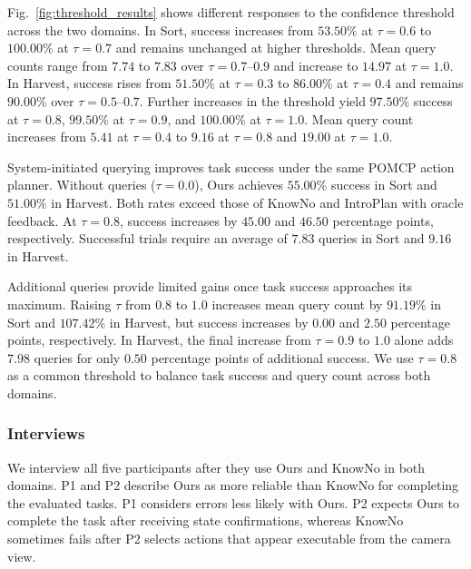 Fig.~\ref{fig:threshold_results} shows different responses to the confidence threshold across the two domains. In Sort, success increases from $53.50\%$ at $\tau=0.6$ to $100.00\%$ at $\tau=0.7$ and remains unchanged at higher thresholds. Mean query counts range from $7.74$ to $7.83$ over $\tau=0.7$--$0.9$ and increase to $14.97$ at $\tau=1.0$. In Harvest, success rises from $51.50\%$ at $\tau=0.3$ to $86.00\%$ at $\tau=0.4$ and remains $90.00\%$ over $\tau=0.5$--$0.7$. Further increases in the threshold yield $97.50\%$ success at $\tau=0.8$, $99.50\%$ at $\tau=0.9$, and $100.00\%$ at $\tau=1.0$. Mean query count increases from $5.41$ at $\tau=0.4$ to $9.16$ at $\tau=0.8$ and $19.00$ at $\tau=1.0$.

System-initiated querying improves task success under the same POMCP action planner. Without queries ($\tau=0.0$), Ours achieves $55.00\%$ success in Sort and $51.00\%$ in Harvest. Both rates exceed those of KnowNo and IntroPlan with oracle feedback. At $\tau=0.8$, success increases by $45.00$ and $46.50$ percentage points, respectively. Successful trials require an average of $7.83$ queries in Sort and $9.16$ in Harvest.

Additional queries provide limited gains once task success approaches its maximum. Raising $\tau$ from $0.8$ to $1.0$ increases mean query count by $91.19\%$ in Sort and $107.42\%$ in Harvest, but success increases by $0.00$ and $2.50$ percentage points, respectively. In Harvest, the final increase from $\tau=0.9$ to $1.0$ alone adds $7.98$ queries for only $0.50$ percentage points of additional success. We use $\tau=0.8$ as a common threshold to balance task success and query count across both domains.


\subsubsection{Interviews}\label{exp:interviews}
We interview all five participants after they use Ours and KnowNo in both domains. P1 and P2 describe Ours as more reliable than KnowNo for completing the evaluated tasks. P1 considers errors less likely with Ours. P2 expects Ours to complete the task after receiving state confirmations, whereas KnowNo sometimes fails after P2 selects actions that appear executable from the camera view.


